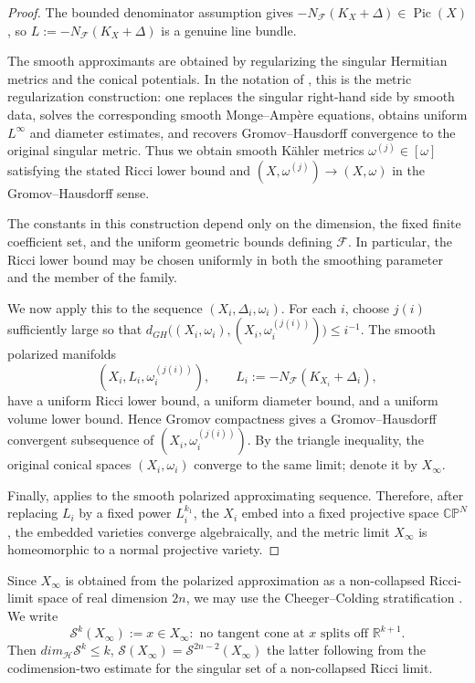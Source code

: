 \documentclass[11pt]{amsart}
\theoremstyle{definition}
\theoremstyle{remark}
\begin{document}
\begin{proof}
The bounded denominator assumption gives
$-N_{\mathcal F}(K_X+\Delta)\in \operatorname{Pic}(X)$, so
$L:=-N_{\mathcal F}(K_X+\Delta)$ is a genuine line bundle.

The smooth approximants are obtained by regularizing the singular Hermitian
metrics and the conical potentials. In the notation of \cite[Section 2]{FGSW}, this
is the metric regularization construction: one replaces the singular
right-hand side by smooth data, solves the corresponding smooth Monge--Amp\`ere
equations, obtains uniform $L^\infty$ and diameter estimates, and recovers
Gromov--Hausdorff convergence to the original singular metric. Thus we obtain
smooth K\"ahler metrics $\omega^{(j)}\in[\omega]$ satisfying the stated Ricci
lower bound and $(X,\omega^{(j)})\longrightarrow (X,\omega)$
in the Gromov--Hausdorff sense.

The constants in this construction depend only on the dimension, the fixed
finite coefficient set, and the uniform geometric bounds defining
$\mathcal F$. In particular, the Ricci lower bound may be chosen uniformly in
both the smoothing parameter and the member of the family.

We now apply this to the sequence $(X_i,\Delta_i,\omega_i)$. For each $i$, choose
$j(i)$ sufficiently large so that $d_{GH}\big((X_i,\omega_i),(X_i,\omega_i^{(j(i))})\big)\leq i^{-1}$.
The smooth polarized manifolds
\[
        (X_i,L_i,\omega_i^{(j(i))}),
        \qquad
        L_i:=-N_{\mathcal F}(K_{X_i}+\Delta_i),
\]
have a uniform Ricci lower bound, a uniform diameter bound, and a uniform volume
lower bound. Hence Gromov compactness gives a Gromov--Hausdorff convergent
subsequence of $(X_i,\omega_i^{(j(i))})$. By the triangle inequality, the original
conical spaces $(X_i,\omega_i)$ converge to the same limit; denote it by
$X_\infty$.

Finally, \cite[Theorem~1.1]{SLI} applies to the smooth polarized
approximating sequence. Therefore, after replacing $L_i$ by a fixed power
$L_i^{k_1}$, the $X_i$ embed into a fixed projective space $\mathbb{CP}^N$, the
embedded varieties converge algebraically, and the metric limit $X_\infty$ is
homeomorphic to a normal projective variety.
\end{proof}


Since $X_\infty$ is obtained from the polarized approximation as a
non-collapsed Ricci-limit space of real dimension $2n$, we may use the
Cheeger--Colding stratification
\cite{CheegerColdingI,CheegerColdingII,CheegerColdingIII}. We write
\[
\mathcal S^k(X_\infty)
:=
{x\in X_\infty:\text{ no tangent cone at }x
\text{ splits off }\mathbb R^{k+1}}.
\]
Then
$dim_{\mathcal H}\mathcal S^k\leq k$, 
$\mathcal S(X_\infty)=\mathcal S^{2n-2}(X_\infty)$
the latter following from the codimension-two estimate for the singular set of
a non-collapsed Ricci limit.
\end{document}
